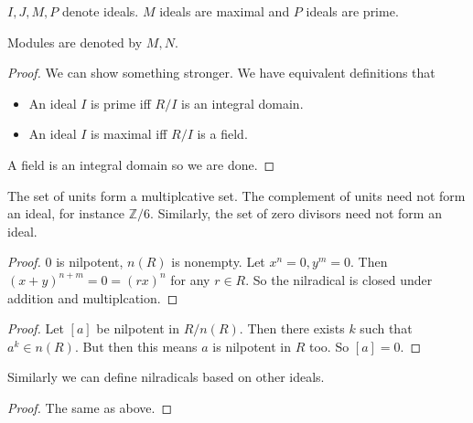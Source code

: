 $I,J,M,P$ denote ideals. $M$ ideals are maximal and $P$ ideals are prime.

Modules are denoted by $M, N$.

\begin{proof}
    We can show something stronger. We have equivalent definitions that\begin{itemize}
        \item An ideal $I$ is prime iff $R/I$ is an integral domain.
        \item An ideal $I$ is maximal iff $R/I$ is a field. 
    \end{itemize}
    A field is an integral domain so we are done.
\end{proof}
\begin{remark}
    The set of units form a multiplcative set. The complement of units need not form an ideal, for instance $\mathbb{Z}/6$. Similarly, the set of zero divisors need not form an ideal.
\end{remark}
\begin{proof}
    $0$ is nilpotent, $n(R)$ is nonempty.
    Let $x^n=0, y^m=0$. Then $(x+y)^{n+m}=0=(rx)^n$ for any $r\in R$. So the nilradical is closed under addition and multiplcation.
\end{proof}
\begin{proof}
    Let $[a]$ be nilpotent in $R/n(R)$. 
    Then there exists $k$ such that $a^k\in n(R)$. But then this means $a$ is nilpotent in $R$ too. So $[a]=0$.
\end{proof}

Similarly we can define nilradicals based on other ideals.  
\begin{proof}
    The same as above.
\end{proof}



